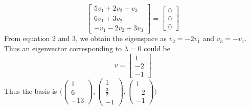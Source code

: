 \documentclass[solution,addpoints,12pt]{exam}
\newenvironment{Solution}{\begin{solution}}{\end{solution}}
\begin{document}
\begin{questions}
\begin{parts}
\begin{Solution}
\[\begin{bmatrix}
         5v_{1}+2v_{2}+v_{3} \\ 6v_{1}+3v_{2} \\ -v_{1}-2v_{2}+3v_{3}
     \end{bmatrix} = \begin{bmatrix}
         0 \\ 0 \\ 0
     \end{bmatrix}\]
     From equation $2$ and $3$, we obtain the eigenspace as $v_{2} = -2v_{1}$ and $v_{3} = -v_{1}$. Thus an eigenvector corresponding to $\lambda = 0$ could be
     \[v = \begin{bmatrix}
         1 \\ -2 \\ -1
     \end{bmatrix}\]
     Thus the basis is $\langle \left( \begin{array}{cc}
         1\\ 6 \\ -13
    \end{array} \right), \left( \begin{array}{cc}
         1 \\ \frac{3}{2} \\ -1
    \end{array} \right),
    \left( \begin{array}{cc}
         1 \\ -2 \\ -1
    \end{array} \right)
    \rangle $
\end{Solution}

\end{parts}
\end{questions}
\end{document}
